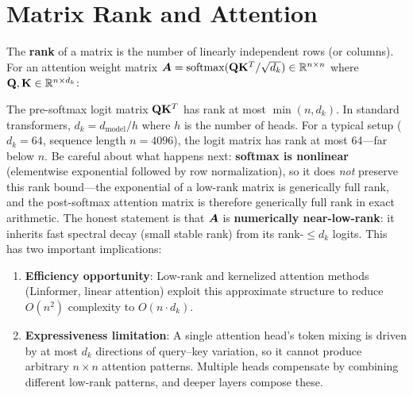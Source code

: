 \begin{interviewq}
\end{interviewq}

\section{Matrix Rank and Attention}
\label{sec:rank_attention}

The \textbf{rank} of a matrix is the number of linearly independent rows (or columns). For an attention weight matrix $\bm{A} = \operatorname{softmax}(\mathbf{Q} \mathbf{K}^T / \sqrt{d_k}) \in \mathbb{R}^{n \times n}$ where $\mathbf{Q}, \mathbf{K} \in \mathbb{R}^{n \times d_k}$:

The pre-softmax logit matrix $\mathbf{Q} \mathbf{K}^T$ has rank at most $\min(n, d_k)$. In standard transformers, $d_k = d_{\text{model}} / h$ where $h$ is the number of heads. For a typical setup ($d_k = 64$, sequence length $n = 4096$), the logit matrix has rank at most 64---far below $n$. Be careful about what happens next: \textbf{softmax is nonlinear} (elementwise exponential followed by row normalization), so it does \textit{not} preserve this rank bound---the exponential of a low-rank matrix is generically full rank, and the post-softmax attention matrix is therefore generically full rank in exact arithmetic. The honest statement is that $\bm{A}$ is \textbf{numerically near-low-rank}: it inherits fast spectral decay (small stable rank) from its rank-$\leq d_k$ logits. This has two important implications:

\begin{enumerate}
    \item \textbf{Efficiency opportunity}: Low-rank and kernelized attention methods (Linformer, linear attention) exploit this approximate structure to reduce $O(n^2)$ complexity to $O(n \cdot d_k)$.
    \item \textbf{Expressiveness limitation}: A single attention head's token mixing is driven by at most $d_k$ directions of query--key variation, so it cannot produce arbitrary $n \times n$ attention patterns. Multiple heads compensate by combining different low-rank patterns, and deeper layers compose these.
\end{enumerate}

